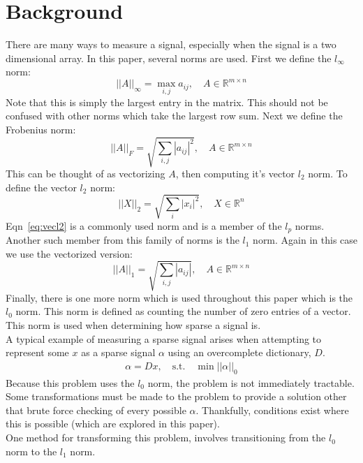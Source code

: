 \documentclass[journal]{IEEEtran}
\begin{document}
\section{Background}
There are many ways to measure a signal, especially when the signal is a two dimensional array. In this
paper, several norms are used. First we define the $l_\infty$ norm:
\begin{equation}
||A||_\infty = \max_{i,j} a_{ij}, \quad A \in \mathbb{R}^{m\times n}
\label{eq:linfty}
\end{equation}
Note that this is simply the largest entry in the matrix. This should not be confused with other 
norms which take the largest row sum. Next we define the Frobenius norm:
\begin{equation}
||A||_F = \sqrt{\sum_{i,j} |a_{ij}|^2}, \quad A \in \mathbb{R}^{m\times n}
\label{eq:frob}
\end{equation}
This can be thought of as vectorizing $A$, then computing it's vector $l_2$ norm.  To define the vector 
$l_2$ norm:
\begin{equation}
||X||_2 = \sqrt{\sum_{i} |x_{i}|^2}, \quad X \in \mathbb{R}^{n}
\label{eq:vecl2}
\end{equation}
Eqn~\ref{eq:vecl2} is a commonly used norm and is a member of the $l_p$ norms. Another such member from
this family of norms is the $l_1$ norm. Again in this case we use the vectorized version:
\begin{equation}
||A||_1 = \sqrt{\sum_{i,j} |a_{ij}|}, \quad A \in \mathbb{R}^{m\times n}
\label{eq:l1}
\end{equation}
Finally, there is one more norm which is used throughout this paper which is the $l_0$ norm. This 
norm is defined as counting the number of zero entries of a vector. This norm is used when determining
how sparse a signal is. \\
A typical example of measuring a sparse signal arises when attempting to represent some $x$ 
as a sparse signal $\alpha$ using an overcomplete dictionary, $D$.
\begin{align}
\alpha = Dx, \quad \mathrm{s.t.} \quad \min ||\alpha||_0
\label{eq:sparseproblem}
\end{align}
Because this problem uses the $l_0$ norm, the problem is not immediately tractable. Some transformations
must be made to the problem to provide a solution other that brute force checking of every possible
$\alpha$. Thankfully, conditions exist where this is possible (which are explored in this paper). \\
One method for transforming this problem, involves transitioning from the $l_0$ norm to the $l_1$ norm.
\end{document}

